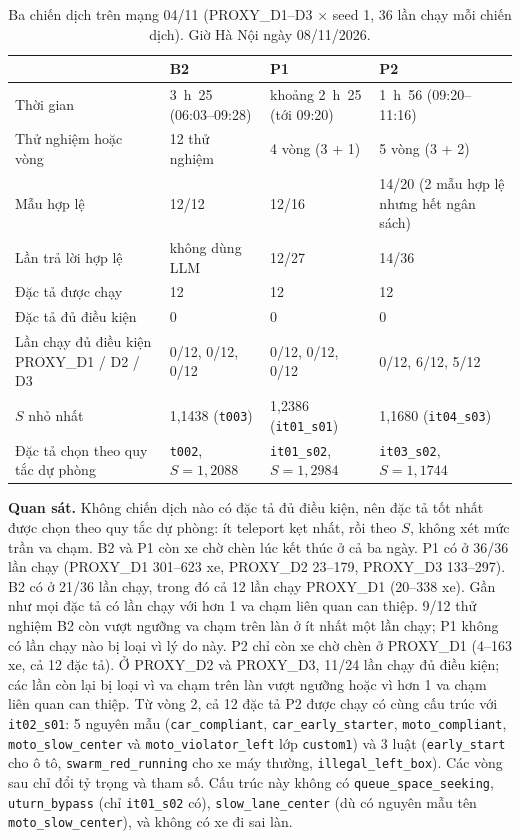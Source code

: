 \documentclass[../main.tex]{subfiles}
\begin{document}
\begin{table}[H]
\centering
\small
\caption{Ba chiến dịch trên mạng 04/11 (PROXY\_D1--D3 $\times$ seed 1, 36 lần chạy mỗi chiến dịch). Giờ Hà Nội ngày 08/11/2026.} \label{table:4.campaigns_n1108}
\begin{tabular}{|p{3.6cm}|p{3.2cm}|p{3.2cm}|p{3.2cm}|}
\hline
 & \textbf{B2} & \textbf{P1} & \textbf{P2} \\ \hline
Thời gian & 3~h~25 (06:03--09:28) & khoảng 2~h~25 (tới 09:20) & 1~h~56 (09:20--11:16) \\ \hline
Thử nghiệm hoặc vòng & 12 thử nghiệm & 4 vòng (3 + 1) & 5 vòng (3 + 2) \\ \hline
Mẫu hợp lệ & 12/12 & 12/16 & 14/20 (2 mẫu hợp lệ nhưng hết ngân sách) \\ \hline
Lần trả lời hợp lệ & không dùng LLM & 12/27 & 14/36 \\ \hline
Đặc tả được chạy & 12 & 12 & 12 \\ \hline
Đặc tả đủ điều kiện & 0 & 0 & 0 \\ \hline
Lần chạy đủ điều kiện PROXY\_D1 / D2 / D3 & 0/12, 0/12, 0/12 & 0/12, 0/12, 0/12 & 0/12, 6/12, 5/12 \\ \hline
$S$ nhỏ nhất & 1,1438 (\texttt{t003}) & 1,2386 (\texttt{it01\_s01}) & 1,1680 (\texttt{it04\_s03}) \\ \hline
Đặc tả chọn theo quy tắc dự phòng & \texttt{t002}, $S = 1{,}2088$ & \texttt{it01\_s02}, $S = 1{,}2984$ & \texttt{it03\_s02}, $S = 1{,}1744$ \\ \hline
\end{tabular}
\end{table}

\begin{sloppypar}
\textbf{Quan sát.} Không chiến dịch nào có đặc tả đủ điều kiện, nên đặc tả tốt nhất được chọn theo quy tắc dự phòng: ít teleport kẹt nhất, rồi theo $S$, không xét mức trần va chạm. B2 và P1 còn xe chờ chèn lúc kết thúc ở cả ba ngày. P1 có ở 36/36 lần chạy (PROXY\_D1 301--623 xe, PROXY\_D2 23--179, PROXY\_D3 133--297). B2 có ở 21/36 lần chạy, trong đó cả 12 lần chạy PROXY\_D1 (20--338 xe). Gần như mọi đặc tả có lần chạy với hơn 1 va chạm liên quan can thiệp. 9/12 thử nghiệm B2 còn vượt ngưỡng va chạm trên làn ở ít nhất một lần chạy; P1 không có lần chạy nào bị loại vì lý do này. P2 chỉ còn xe chờ chèn ở PROXY\_D1 (4--163 xe, cả 12 đặc tả). Ở PROXY\_D2 và PROXY\_D3, 11/24 lần chạy đủ điều kiện; các lần còn lại bị loại vì va chạm trên làn vượt ngưỡng hoặc vì hơn 1 va chạm liên quan can thiệp. Từ vòng 2, cả 12 đặc tả P2 được chạy có cùng cấu trúc với \texttt{it02\_s01}: 5 nguyên mẫu (\texttt{car\_compliant}, \texttt{car\_early\_starter}, \texttt{moto\_compliant}, \texttt{moto\_slow\_center} và \texttt{moto\_violator\_left} lớp \texttt{custom1}) và 3 luật (\texttt{early\_start} cho ô tô, \texttt{swarm\_red\_running} cho xe máy thường, \texttt{illegal\_left\_box}). Các vòng sau chỉ đổi tỷ trọng và tham số. Cấu trúc này không có \texttt{queue\_space\_seeking}, \texttt{uturn\_bypass} (chỉ \texttt{it01\_s02} có), \texttt{slow\_lane\_center} (dù có nguyên mẫu tên \texttt{moto\_slow\_center}), và không có xe đi sai làn.
\end{sloppypar}
\end{document}

